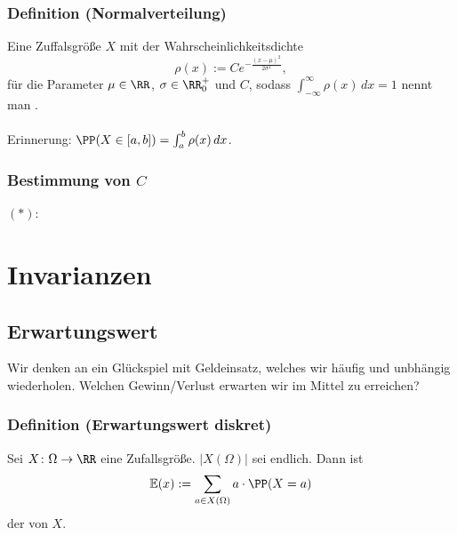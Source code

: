 \subsubsection{Definition (Normalverteilung)}
Eine Zuffalsgr\"o\ss{}e $X$ mit der Wahrscheinlichkeitsdichte
\[\rho(x):=Ce^{-\frac{(x-\mu)^2}{2\sigma^{2}}},\]
f\"ur die Parameter $\mu\in\RR$, $\sigma\in\RR_0^+$ und $C$, sodass $\int_{-\infty}^{\infty}\rho(x)\,dx=1$ nennt man .
\\~\\
Erinnerung: $\PP(X\in[a,b])=\int_a^b\rho(x)\,dx$.
\subsubsection{Bestimmung von $C$}
$(*)$:
\section{Invarianzen}
\subsection{Erwartungswert}
Wir denken an ein Gl\"uckspiel mit Geldeinsatz, welches wir h\"aufig und unbh\"angig wiederholen. Welchen Gewinn/Verlust erwarten wir im Mittel zu erreichen?
\subsubsection{Definition (Erwartungswert diskret)}
Sei $X\colon\Omega\to\RR$ eine Zufallsgr\"o\ss{}e. $|X(\Omega)|$ sei endlich. Dann ist
\[\mathbb{E}(x):=\sum_{a\in X(\Omega)}a\cdot\PP(X=a)\]
der  von $X$.
